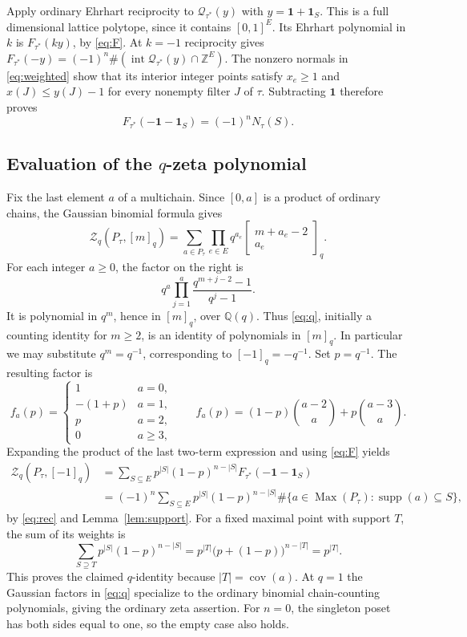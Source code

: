 \documentclass[11pt]{article}
\newcommand{\Q}{\mathcal Q}
\newcommand{\supp}{\operatorname{supp}}
\newcommand{\Max}{\operatorname{Max}}
\newcommand{\cov}{\operatorname{cov}}
\newcommand{\Z}{\mathbb Z}
\begin{document}
Apply ordinary Ehrhart reciprocity to $\Q_{\tau^*}(y)$ with
$y=\mathbf1+\mathbf1_S$. This is a full dimensional lattice polytope,
since it contains $[0,1]^E$. Its Ehrhart polynomial in $k$ is
$F_{\tau^*}(ky)$, by \eqref{eq:F}. At $k=-1$ reciprocity gives
$F_{\tau^*}(-y)=(-1)^n\#(\operatorname{int}\Q_{\tau^*}(y)\cap\Z^E)$.
The nonzero normals in \eqref{eq:weighted} show that its interior
integer points satisfy $x_e\ge1$ and $x(J)\le y(J)-1$ for every
nonempty filter $J$ of $\tau$. Subtracting $\mathbf1$ therefore proves
\begin{equation}\label{eq:rec}
 F_{\tau^*}(-\mathbf1-\mathbf1_S)=(-1)^n N_\tau(S).
\end{equation}

\subsection*{Evaluation of the $q$-zeta polynomial}
Fix the last element $a$ of a multichain. Since $[0,a]$ is a product
of ordinary chains, the Gaussian binomial formula gives
\begin{equation}\label{eq:q}
 \mathcal Z_q(P_\tau,[m]_q)
   =\sum_{a\in P_\tau}\prod_{e\in E}
           q^{a_e}\begin{bmatrix}m+a_e-2\\a_e\end{bmatrix}_q.
\end{equation}
For each integer $a\ge0$, the factor on the right is
\[
 q^a\prod_{j=1}^a\frac{q^{m+j-2}-1}{q^j-1}.
\]
It is polynomial in $q^m$, hence in $[m]_q$, over $\mathbb Q(q)$.
Thus \eqref{eq:q}, initially a counting identity for $m\ge2$,
is an identity of polynomials in $[m]_q$. In particular we may
substitute $q^m=q^{-1}$, corresponding to $[-1]_q=-q^{-1}$.
Set $p=q^{-1}$. The resulting factor is
\[
 f_a(p)=
 \begin{cases}1&a=0,\\-(1+p)&a=1,\\p&a=2,\\0&a\ge3,\end{cases}
 \qquad
 f_a(p)=(1-p)\binom{a-2}{a}+p\binom{a-3}{a}.
\]
Expanding the product of the last two-term expression and using
\eqref{eq:F} yields
\begin{align*}
 \mathcal Z_q(P_\tau,[-1]_q)
 &=\sum_{S\subseteq E}p^{|S|}(1-p)^{n-|S|}
                  F_{\tau^*}(-\mathbf1-\mathbf1_S)\\
 &=(-1)^n\sum_{S\subseteq E}p^{|S|}(1-p)^{n-|S|}
       \#\{a\in\Max(P_\tau):\supp(a)\subseteq S\},
\end{align*}
by \eqref{eq:rec} and Lemma~\ref{lem:support}.
For a fixed maximal point with support $T$, the sum of its weights is
\[
 \sum_{S\supseteq T}p^{|S|}(1-p)^{n-|S|}
     =p^{|T|}\bigl(p+(1-p)\bigr)^{n-|T|}=p^{|T|}.
\]
This proves the claimed $q$-identity because $|T|=\cov(a)$.
At $q=1$ the Gaussian factors in \eqref{eq:q} specialize to the
ordinary binomial chain-counting polynomials, giving the ordinary
zeta assertion. For $n=0$, the singleton poset has both sides equal
to one, so the empty case also holds.
\end{document}

